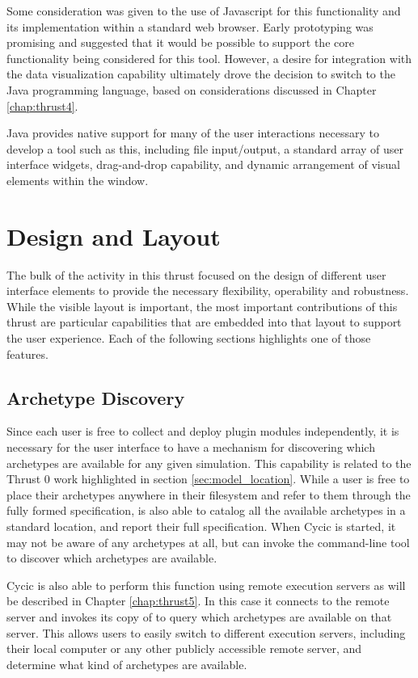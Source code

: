 Some consideration was given to the use of Javascript for this functionality
and its implementation within a standard web browser.  Early prototyping was
promising and suggested that it would be possible to support the core
functionality being considered for this tool.  However, a desire for
integration with the data visualization capability ultimately drove the
decision to switch to the Java programming language, based on considerations
discussed in Chapter \ref{chap:thrust4}.

Java provides native support for many of the user interactions necessary to
develop a tool such as this, including file input/output, a standard array of
user interface widgets, drag-and-drop capability, and dynamic arrangement of
visual elements within the window.

\section{Design and Layout}

The bulk of the activity in this thrust focused on the design of different
user interface elements to provide the necessary flexibility, operability and
robustness.  While the visible layout is important, the most important
contributions of this thrust are particular capabilities that are embedded
into that layout to support the user experience.  Each of the following
sections highlights one of those features.

\subsection{Archetype Discovery}

Since each user is free to collect and deploy plugin modules independently, it
is necessary for the user interface to have a mechanism for discovering which
archetypes are available for any given simulation.  This capability is related
to the Thrust 0 work highlighted in section \ref{sec:model_location}.  While a
user is free to place their archetypes anywhere in their filesystem and refer
to them through the fully formed specification, \Cyclus is also able to
catalog all the available archetypes in a standard location, and report their
full specification.  When Cycic is started, it may not be aware of any
archetypes at all, but can invoke the \Cyclus command-line tool to discover
which archetypes are available.

Cycic is also able to perform this function using remote execution servers as
will be described in Chapter \ref{chap:thrust5}.  In this case it connects to
the remote server and invokes its copy of \Cyclus to query which archetypes
are available on that server.  This allows users to easily switch to different
execution servers, including their local computer or any other publicly
accessible remote server, and determine what kind of archetypes are available.

